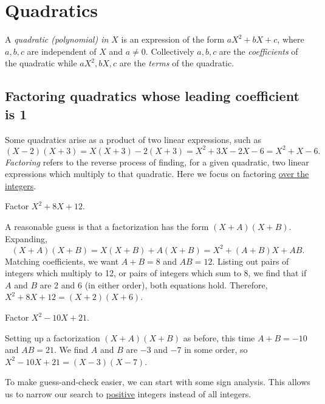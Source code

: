 \section{Quadratics}

A \emph{quadratic (polynomial) in $X$} is an expression of the form $aX^2 + bX + c$, where $a,b,c$ are independent of $X$ and $a\neq 0$. Collectively $a,b,c$ are the \emph{coefficients} of the quadratic while $aX^2, bX, c$ are the \emph{terms} of the quadratic.

\subsection{Factoring quadratics whose leading coefficient is 1}

Some quadratics arise as a product of two linear expressions, such as
\begin{equation*}
(X - 2)(X + 3) = X(X + 3) - 2(X + 3) = X^2 + 3X - 2X - 6 = X^2 + X - 6. 
\end{equation*}
\emph{Factoring} refers to the reverse process of finding, for a given quadratic, two linear expressions which multiply to that quadratic. Here we focus on factoring \underline{over the integers}.

\begin{example}
Factor $X^2 + 8X + 12$.
\end{example}
\begin{solution}
A reasonable guess is that a factorization has the form $(X + A)(X + B)$. Expanding,
\begin{equation*}
(X + A)(X + B) = X(X + B) + A(X + B) = X^2 + (A + B)X + AB.
\end{equation*}
Matching coefficients, we want $A + B = 8$ and $AB = 12$. Listing out pairs of integers which multiply to 12, or pairs of integers which sum to 8, we find that if $A$ and $B$ are $2$ and $6$ (in either order), both equations hold. Therefore, $X^2 + 8X + 12 = \boxed{(X + 2)(X + 6)}$.
\end{solution}

\begin{example}
Factor $X^2 - 10X + 21$.
\end{example}
\begin{solution}
Setting up a factorization $(X + A)(X + B)$ as before, this time $A + B = -10$ and $AB = 21$. We find $A$ and $B$ are $-3$ and $-7$ in some order, so $X^2 - 10X + 21 = \boxed{(X - 3)(X - 7)}$.
\end{solution}

To make guess-and-check easier, we can start with some sign analysis. This allows us to narrow our search to \underline{positive} integers instead of all integers.

